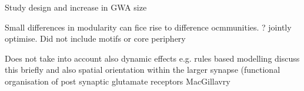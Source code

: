  
Study design and increase in GWA size

Small differences in modularity can fice rise to difference ocmmunities. ? jointly optimise.
Did not include motifs or core periphery





Does not take into account also dynamic effects e.g. rules based modelling discuss this briefly and also spatial orientation within the larger synapse (functional organisation of post synaptic glutamate receptors MacGillavry
